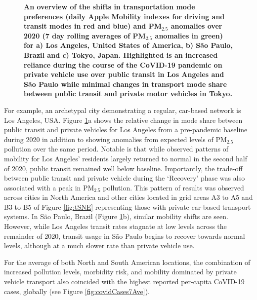 \documentclass[preprint,12pt]{elsarticle}
\begin{document}
\begin{figure}
         \label{fig:Tokyo}
        \caption{\bf An overview of the shifts in transportation mode preferences (daily Apple Mobility indexes for driving and transit modes in red and blue) and PM$_{2.5}$ anomalies over 2020 (7 day rolling averages of PM$_{2.5}$ anomalies in green) for a) Los Angeles, United States of America, b) S\~ao Paulo, Brazil and c) Tokyo, Japan. Highlighted is an increased reliance during the course of the CoVID-19 pandemic on private vehicle use over public transit in Los Angeles and S\~ao Paulo while minimal changes in transport mode share between public transit and private motor vehicles in Tokyo.}
        \label{fig:three_graphs_Driv_trans}
\end{figure}

For example, an archetypal city demonstrating a regular, car-based network is Los Angeles, USA. Figure \ref{fig:three_graphs_Driv_trans}a shows the relative change in mode share between public transit and private vehicles for Los Angeles from a pre-pandemic baseline during 2020 in addition to showing anomalies from expected levels of PM$_{2.5}$ pollution over the same period. Notable is that while observed patterns of mobility for Los Angeles' residents largely returned to normal in the second half of 2020, public transit remained well below baseline. Importantly, the trade-off between public transit and private vehicle during the `Recovery' phase was also associated with a peak in PM$_{2.5}$ pollution. This pattern of results was observed across cities in North America and other cities located in grid areas A3 to A5 and B3 to B5 of Figure \ref{fig:tSNE} representing those with private car-based transport systems. In S\~ao Paulo, Brazil (Figure \ref{fig:three_graphs_Driv_trans}b), similar mobility shifts are seen. However, while Los Angeles transit rates stagnate at low levels across the remainder of 2020, transit usage in S\~ao Paulo begins to recover towards normal levels, although at a much slower rate than private vehicle use.

For the average of both North and South American locations, the combination of increased pollution levels, morbidity risk, and mobility dominated by private vehicle transport also coincided with the highest reported per-capita CoVID-19 cases, globally (see Figure \ref{fig:covidCases7Ave}). 
\end{document}
